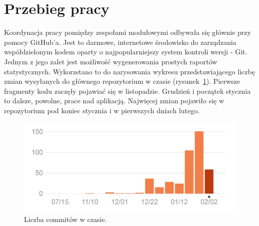 \section{Przebieg pracy}
Koordynacja pracy pomiędzy zespołami modułowymi odbywała się głównie przy pomocy GitHub'a. Jest to darmowe, internetowe środowisko do zarządzania współdzielonym kodem oparty o najpopularniejszy system kontroli wersji - Git. Jednym z jego zalet jest możliwość wygenerowania prostych raportów statystycznych. Wykorzstano to do narysowania wykresu przedstawiającego liczbę zmian wysyłanych do głównego repozytorium w czasie (rysunek~\ref{fig:commits}). Pierwsze fragmenty kodu zaczęły pojawiać się w listopadzie. Grudzień i początek stycznia to dalsze, powolne, prace nad aplikacją. Najwięcej zmian pojawiło się w repozytorium pod koniec stycznia i w pierwszych dniach lutego.
\begin{figure}[h]
\centering
\includegraphics[scale=0.35]{PODSUMOWANIE/commits.jpg}
\caption{Liczba commitów w czasie.}
\label{fig:commits}
\end{figure}